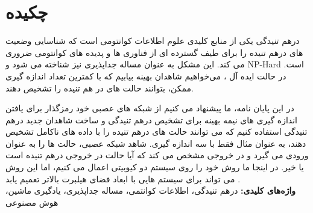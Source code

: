 
\section*{چکیده}
\begin{spacing}{2}

درهم تنیدگی یکی از منابع کلیدی علوم اطلاعات کوانتومی است که شناسایی وضعیت های درهم تنیده را برای طیف گسترده ای از فناوری ها و پدیده های کوانتومی ضروری می کند. این مشکل به عنوان مساله جداپذیری نیز شناخته می شود و
NP-Hard
است.
در حالت ایده آل ، می‌خواهیم شاهدان بهینه بیابیم که با کمترین تعداد اندازه گیری ممکن، بتوانند حالت های در هم تنیده را تشخیص دهند.

در این پایان نامه، ما پیشنهاد می کنیم از شبکه های عصبی خود رمزگذار برای یافتن اندازه گیری های نیمه بهینه برای تشخیص درهم تنیدگی و ساخت شاهدان جدید درهم تنیدگی استفاده کنیم که می توانند حالت های درهم تنیده را با داده های ناکامل تشخیص دهند، به عنوان مثال فقط با سه اندازه گیری. شاهد شبکه عصبی، حالت ها را به عنوان ورودی می گیرد و در خروجی مشخص می کند که آیا حالت در خروجی درهم تنیده است یا خیر. در اینجا ما روش خود را روی سیستم دو کیوبیتی اعمال می کنیم، اما این روش می تواند برای سیستم هایی با ابعاد فضای هیلبرت بالاتر تعمیم یابد
.\\

\textbf{واژه‌های کلیدی:}
درهم تنیدگی، اطلاعات کوانتمی، مساله جداپذیری، یادگیری ماشین، هوش مصنوعی
\end{spacing}

\newpage\null\newpage
